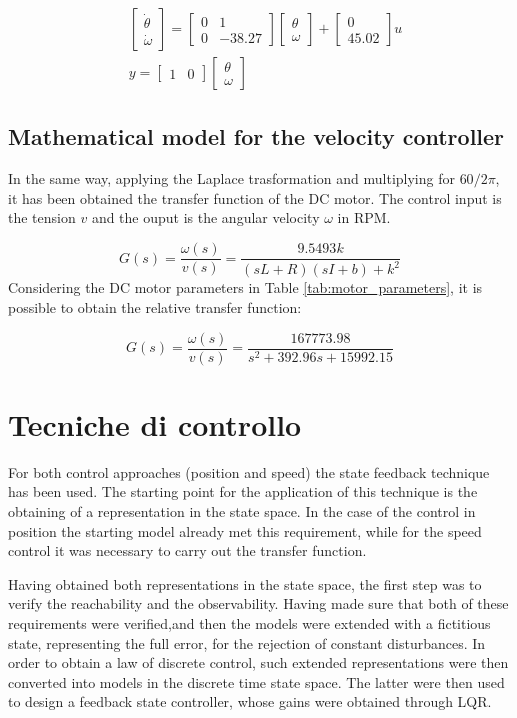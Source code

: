 \documentclass[11pt,a4paper,oneside]{extarticle}
\newcommand\mtrx[1]{
    \begin{bmatrix}
        #1
    \end{bmatrix}
}
\begin{document}
\begin{equation}
	\begin{split}
		&\mtrx{\dot{\theta}\\ \dot{\omega}}= \mtrx{0 & 1\\ 0 & -38.27}\mtrx{\theta\\ \omega} + \mtrx{0\\ 45.02}u\\
		&y = \mtrx{1 & 0}\mtrx{\theta\\ \omega}
	\end{split}
\end{equation}

\subsection{Mathematical model for the velocity controller}
In the same way, applying the Laplace trasformation and multiplying 
for $60/2\pi$, it has been obtained the transfer function of the DC
motor. The control input is the tension $v$ and the ouput is the 
angular velocity $\omega$ in RPM.

\begin{equation}
	G(s) = \frac{\omega(s)}{v(s)} = \frac{9.5493k}
	{(sL + R)(sI + b) + k^2}
\end{equation}
Considering the DC motor parameters in Table 
\ref{tab:motor_parameters}, it is possible to obtain the relative
transfer function:

\begin{equation}
	G(s) = \frac{\omega(s)}{v(s)} = \frac{167773.98}{s^2 + 392.96s + 15992.15}
\end{equation}

\section{Tecniche di controllo}
For both control approaches (position and speed) the state feedback 
technique has been used. The starting point for the application of 
this technique is the obtaining of a representation in the state 
space. In the case of the control in position the starting model 
already met this requirement, while for the speed control it was 
necessary to carry out the transfer function. \bigskip

Having obtained both representations in the state space, the first 
step was to verify the reachability and the observability. Having 
made sure that both of these requirements were verified,and then the 
models were extended with a fictitious state, representing the full error,  
for the rejection of constant disturbances. In order to obtain a law 
of discrete control, such extended representations were then converted 
into models in the discrete time state space. The latter were then 
used to design a feedback state controller, whose gains 
were obtained through LQR.\bigskip
\end{document}
